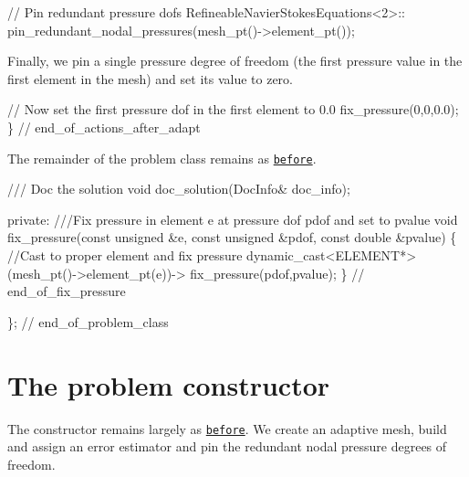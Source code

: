 \begin{DoxyCodeInclude}
    
    \textcolor{comment}{// Pin redundant pressure dofs}
   RefineableNavierStokesEquations<2>::
    pin\_redundant\_nodal\_pressures(mesh\_pt()->element\_pt());

\end{DoxyCodeInclude}


Finally, we pin a single pressure degree of freedom (the first pressure value in the first element in the mesh) and set its value to zero.


\begin{DoxyCodeInclude}
   
   \textcolor{comment}{// Now set the first pressure dof in the first element to 0.0}
   fix\_pressure(0,0,0.0);
  \} \textcolor{comment}{// end\_of\_actions\_after\_adapt}

\end{DoxyCodeInclude}


The remainder of the problem class remains as \href{../../driven_cavity/html/index.html#problem}{\tt before}.


\begin{DoxyCodeInclude}
 \textcolor{comment}{}
\textcolor{comment}{ /// Doc the solution}
\textcolor{comment}{} \textcolor{keywordtype}{void} doc\_solution(DocInfo& doc\_info);
 
 
\textcolor{keyword}{private}:
\textcolor{comment}{}
\textcolor{comment}{ ///Fix pressure in element e at pressure dof pdof and set to pvalue}
\textcolor{comment}{} \textcolor{keywordtype}{void} fix\_pressure(\textcolor{keyword}{const} \textcolor{keywordtype}{unsigned} &e, \textcolor{keyword}{const} \textcolor{keywordtype}{unsigned} &pdof, 
                   \textcolor{keyword}{const} \textcolor{keywordtype}{double} &pvalue)
  \{
   \textcolor{comment}{//Cast to proper element and fix pressure}
   \textcolor{keyword}{dynamic\_cast<}ELEMENT*\textcolor{keyword}{>}(mesh\_pt()->element\_pt(e))->
                          fix\_pressure(pdof,pvalue);
  \} \textcolor{comment}{// end\_of\_fix\_pressure}

\}; \textcolor{comment}{// end\_of\_problem\_class}

\end{DoxyCodeInclude}




 

\hypertarget{index_constructor}{}\section{The problem constructor}\label{index_constructor}
The constructor remains largely as \href{../../driven_cavity/html/index.html#constructor}{\tt before}. We create an adaptive mesh, build and assign an error estimator and pin the redundant nodal pressure degrees of freedom.


